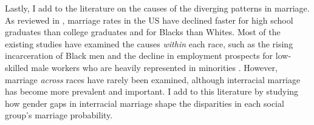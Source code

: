 Lastly, I add to the literature on the causes of the diverging patterns in marriage. As reviewed in \cite{LundbergPollakStearns_2016_FamilyInequality}, marriage rates in the US have declined faster for high school graduates than college graduates and for Blacks than Whites. Most of the existing studies have examined the causes \textit{within} each race, such as the rising incarceration of Black men \citep{CharlesLuoh_2010_MaleIncarcerationMarriage, Liu_2020_Incarceration, CaucuttGunerRauh_2021_BlackWhiteMarraigeGap} and the decline in employment prospects for low-skilled male workers who are heavily represented in minorities \citep{AutorDornHanson_2019_FallingMarriageMarketValue}. However, marriage \textit{across} races have rarely been examined, although interracial marriage has become more prevalent and important. I add to this literature by studying how gender gaps in interracial marriage shape the disparities in each social group's marriage probability.


